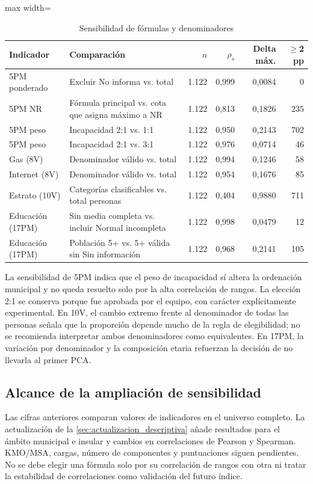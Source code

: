 \begin{table}[htbp]
\centering\small
\caption{Sensibilidad de fórmulas y denominadores}\label{tab:sensibilidad}
\begin{adjustbox}{max width=\textwidth}
\begin{tabular}{@{}p{}p{}r r r r@{}}
\toprule
\textbf{Indicador} & \textbf{Comparación} & \textbf{$n$} & \textbf{$\rho_s$} & \textbf{Delta máx.} & \textbf{$\geq$2 pp}\\
\midrule
5PM ponderado & Excluir No informa vs. total & 1.122 & 0,999 & 0,0084 & 0 \\
5PM NR & Fórmula principal vs. cota que asigna máximo a NR & 1.122 & 0,813 & 0,1826 & 235 \\
5PM peso & Incapacidad 2:1 vs. 1:1 & 1.122 & 0,950 & 0,2143 & 702 \\
5PM peso & Incapacidad 2:1 vs. 3:1 & 1.122 & 0,976 & 0,0714 & 46 \\
Gas (8V) & Denominador válido vs. total & 1.122 & 0,994 & 0,1246 & 58 \\
Internet (8V) & Denominador válido vs. total & 1.122 & 0,954 & 0,1676 & 85 \\
Estrato (10V) & Categorías clasificables vs. total personas & 1.122 & 0,404 & 0,9880 & 711 \\
Educación (17PM) & Sin media completa vs. incluir Normal incompleta & 1.122 & 0,998 & 0,0479 & 12 \\
Educación (17PM) & Población 5+ vs. 5+ válida sin Sin información & 1.122 & 0,968 & 0,2141 & 105 \\
\bottomrule
\end{tabular}
\end{adjustbox}
\end{table}

La sensibilidad de 5PM indica que el peso de incapacidad sí altera la ordenación municipal y no queda resuelto solo por la alta correlación de rangos. La elección 2:1 se conserva porque fue aprobada por el equipo, con carácter explícitamente experimental. En 10V, el cambio extremo frente al denominador de todas las personas señala que la proporción depende mucho de la regla de elegibilidad; no se recomienda interpretar ambos denominadores como equivalentes. En 17PM, la variación por denominador y la composición etaria refuerzan la decisión de no llevarla al primer PCA.

\subsection{Alcance de la ampliación de sensibilidad}

Las cifras anteriores comparan valores de indicadores en el universo completo. La actualización de la \cref{sec:actualizacion_descriptiva} añade resultados para el ámbito municipal e insular y cambios en correlaciones de Pearson y Spearman. KMO/MSA, cargas, número de componentes y puntuaciones siguen pendientes. No se debe elegir una fórmula solo por su correlación de rangos con otra ni tratar la estabilidad de correlaciones como validación del futuro índice.
